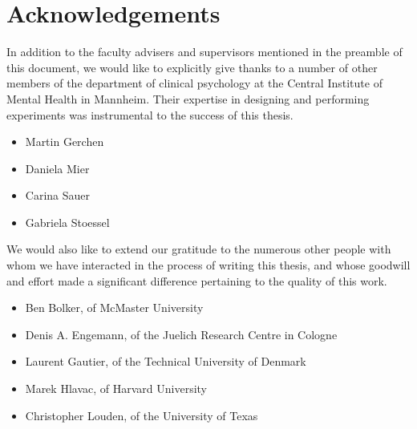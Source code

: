 \chapter{Acknowledgements}
    In addition to the faculty advisers and supervisors mentioned in the preamble of this document, we would like to explicitly give thanks to a number of other members of the department of clinical psychology at the Central Institute of Mental Health in Mannheim.
    Their expertise in designing and performing experiments was instrumental to the success of this thesis.
    \begin{itemize}
	\item Martin Gerchen
	\item Daniela Mier
	\item Carina Sauer
	\item Gabriela Stoessel
    \end{itemize}
    \vspace{0.5cm}
    We would also like to extend our gratitude to the numerous other people with whom we have interacted in the process of writing this thesis, and whose goodwill and effort made a significant difference pertaining to the quality of this work.
    \begin{itemize}
	\item Ben Bolker, of McMaster University
        \item Denis A. Engemann, of the Juelich Research Centre in Cologne
	\item Laurent Gautier, of the Technical University of Denmark
	\item Marek Hlavac, of Harvard University
	\item Christopher Louden, of the University of Texas
    \end{itemize}

